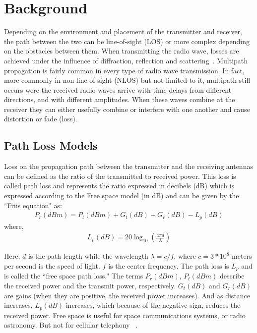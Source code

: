 

\section{Background}
\label{sec:background}

Depending on the environment and placement of the transmitter and receiver, the path between the two can be line-of-sight (LOS) or 
more complex depending on the obstacles between them. When transmitting the radio wave, losses are achieved
under the influence of diffraction, reflection and scattering~\cite{educationalsimulation}. Multipath propagation is fairly common in every type of radio wave transmission.
In fact, more commonly in non-line of sight (NLOS) but not limited to it, multipath still occurs were the received radio waves arrive with time
delays from different directions, and with different amplitudes. When these waves combine at the receiver they can either usefully combine 
or interfere with one another and cause distortion or fade (loss). 

\subsection*{Path Loss Models}
Loss on the propagation path between the transmitter and the receiving antennas can be defined as the ratio of the transmitted to 
received power. This loss is called path loss and represents the ratio expressed in decibels (dB) which is expressed according to the Free 
space model (in dB) and can be given by the ``Friis equation" as: 
\begin{align}
P_r(dBm) = P_t(dBm) + G_t(dB) + G_r(dB) - L_p(dB)
\end{align}
where,
\begin{align}
L_p(dB) = 20\log_{10}(\frac{4\pi d}{\lambda})
\end{align}

Here, $d$ is the path length while the wavelength $\lambda = c / f$, where $c=3*10^8$ meters per second is the speed of light. $f$ is the 
center frequency. The path loss is $L_p$ and is called the ``free space path loss." The terms $P_r(dBm)$, $P_t(dBm)$ describe the received
power and the transmit power, respectively. $G_t(dB)$ 
and $G_r(dB)$ are gains (when they are positive, the received power increases). And as distance increases, $L_p(dB)$ increases, which 
because of the negative sign, reduces the received power. Free space is useful for space communications systems, or radio astronomy. But
not for cellular telephony ~\cite{pathlossmodels}.


